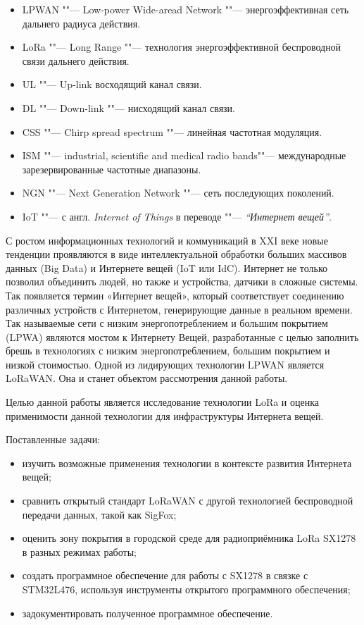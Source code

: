 \Abbreviations
\begin{itemize}
  \item[] LPWAN ""--- Low-power Wide-aread Network ""--- энергоэффективная сеть 
дальнего радиуса действия.
  \item[] LoRa ""--- Long Range ""--- технология энергоэффективной беспроводной 
связи дальнего действия.
  \item[] UL ""--- Up-link восходящий канал связи.
  \item[] DL ""--- Down-link ""--- нисходящий канал связи.
  \item[] CSS ""--- Chirp spread spectrum ""--- линейная частотная модуляция.
  \item[] ISM ""--- industrial, scientific and medical radio bands""--- 
международные зарезервированные частотные диапазоны.
  \item[] NGN ""--- Next Generation Network ""--- сеть последующих поколений.
  \item[] IoT ""--- с англ. \textit{Internet of Things} в переводе ""--- 
\textit{``Интернет вещей''}.
\end{itemize}

\Introduction
С ростом информационных технологий и коммуникаций в XXI веке новые тенденции проявляются в виде интеллектуальной обработки больших массивов данных (Big Data) и Интернете вещей (IoT или IdC). 
Интернет не только позволил объединить людей, но также и устройства, датчики в сложные системы. 
Так появляется термин «Интернет вещей», который соответствует соединению различных устройств с Интернетом, генерирующие данные в реальном времени. 
Так называемые сети с низким энергопотреблением и большим покрытием (LPWA) являются мостом к Интернету Вещей, разработанные с целью заполнить брешь в технологиях с низким энергопотреблением, большим покрытием и низкой стоимостью. 
Одной из лидирующих технологии LPWAN является LoRaWAN. Она и станет объектом рассмотрения данной работы.

Целью данной работы является исследование технологии LoRa и оценка применимости 
данной технологии для инфраструктуры Интернета вещей.

Поставленные задачи:
\begin{itemize}
	\item изучить возможные применения технологии в контексте развития Интернета вещей;
	\item сравнить открытый стандарт LoRaWAN с другой технологией
беспроводной передачи данных, такой как SigFox;
	\item оценить зону покрытия в городской среде для 
радиоприёмника LoRa SX1278 в разных режимах работы;
	\item создать программное обеспечение для работы с SX1278 в связке с
STM32L476, используя инструменты открытого программного обеспечения;
	\item задокументировать полученное программное обеспечение.
\end{itemize}


